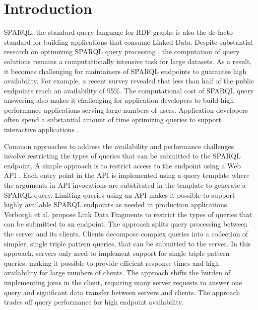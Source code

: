 \section{Introduction}
SPARQL, the standard query language for RDF graphs is also the de-facto standard for building applications that consume Linked Data. 
Despite substantial research on optimizing SPARQL query processing \cite{Pham2013}, the computation of query solutions remains a computationally intensive task for large datasets.
As a result, it becomes challenging for maintainers of SPARQL endpoints to guarantee high availability.
For example, a recent survey \cite{buil2013sparql} revealed that less than half of the public endpoints reach an availability of 95\%.
The computational cost of SPARQL query answering also makes it challenging for application developers to build high performance applications serving large numbers of users.
Application developers often spend a substantial amount of time optimizing queries to support interactive applications \cite{Loizou_Angles_Groth_2014}.

Common approaches to address the availability and performance challenges involve restricting the types of queries that can be submitted to the SPARQL endpoint.
A simple approach is to restrict access to the endpoint using a Web API \cite{Groth_Loizou_Gray_Goble_Harland_Pettifer_2014}.
Each entry point in the API is implemented using a query template where the arguments in API invocations are substituted in the template to generate a SPARQL query.
Limiting queries using an API makes it possible to support highly available SPARQL endpoints as needed in production applications.
%
Verborgh et al. \cite{Verborgh2014} propose Link Data Fragments to restrict the types of queries that can be submitted to an endpoint. 
The approach splits query processing between the server and its clients.
Clients decompose complex queries into a collection of simpler, single triple pattern queries, that can be submitted to the server.
In this approach, servers only need to implement support for single triple pattern queries, making it possible to provide efficient response times and high availability for large numbers of clients.
The approach shifts the burden of implementing joins in the client, requiring many server requests to answer one query and significant data transfer between servers and clients. 
The approach trades off query performance for high endpoint availability.


